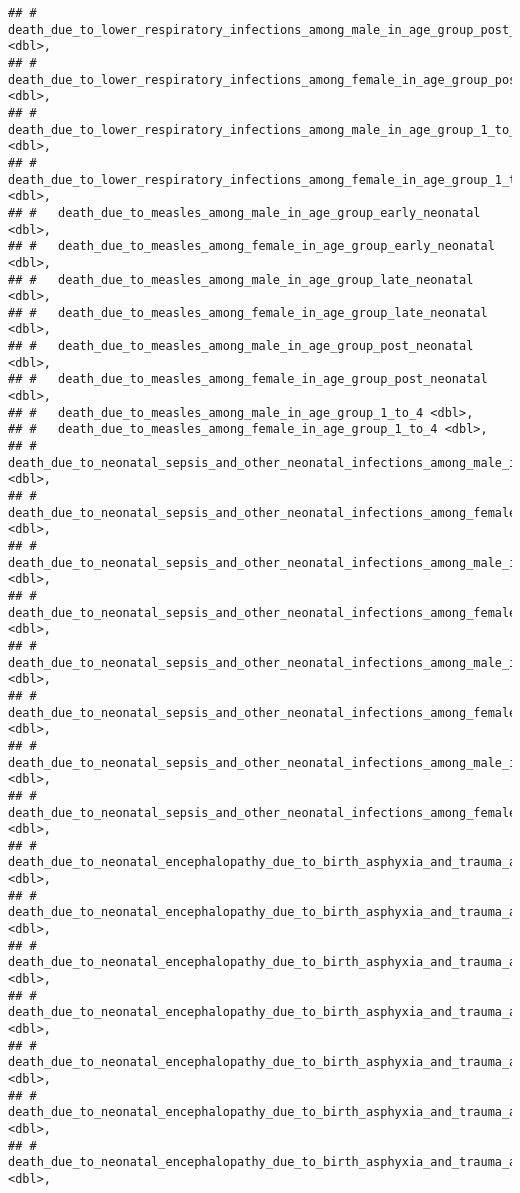 \documentclass[]{article}
\begin{document}
\begin{verbatim}
## #   death_due_to_lower_respiratory_infections_among_male_in_age_group_post_neonatal <dbl>,
## #   death_due_to_lower_respiratory_infections_among_female_in_age_group_post_neonatal <dbl>,
## #   death_due_to_lower_respiratory_infections_among_male_in_age_group_1_to_4 <dbl>,
## #   death_due_to_lower_respiratory_infections_among_female_in_age_group_1_to_4 <dbl>,
## #   death_due_to_measles_among_male_in_age_group_early_neonatal <dbl>,
## #   death_due_to_measles_among_female_in_age_group_early_neonatal <dbl>,
## #   death_due_to_measles_among_male_in_age_group_late_neonatal <dbl>,
## #   death_due_to_measles_among_female_in_age_group_late_neonatal <dbl>,
## #   death_due_to_measles_among_male_in_age_group_post_neonatal <dbl>,
## #   death_due_to_measles_among_female_in_age_group_post_neonatal <dbl>,
## #   death_due_to_measles_among_male_in_age_group_1_to_4 <dbl>,
## #   death_due_to_measles_among_female_in_age_group_1_to_4 <dbl>,
## #   death_due_to_neonatal_sepsis_and_other_neonatal_infections_among_male_in_age_group_early_neonatal <dbl>,
## #   death_due_to_neonatal_sepsis_and_other_neonatal_infections_among_female_in_age_group_early_neonatal <dbl>,
## #   death_due_to_neonatal_sepsis_and_other_neonatal_infections_among_male_in_age_group_late_neonatal <dbl>,
## #   death_due_to_neonatal_sepsis_and_other_neonatal_infections_among_female_in_age_group_late_neonatal <dbl>,
## #   death_due_to_neonatal_sepsis_and_other_neonatal_infections_among_male_in_age_group_post_neonatal <dbl>,
## #   death_due_to_neonatal_sepsis_and_other_neonatal_infections_among_female_in_age_group_post_neonatal <dbl>,
## #   death_due_to_neonatal_sepsis_and_other_neonatal_infections_among_male_in_age_group_1_to_4 <dbl>,
## #   death_due_to_neonatal_sepsis_and_other_neonatal_infections_among_female_in_age_group_1_to_4 <dbl>,
## #   death_due_to_neonatal_encephalopathy_due_to_birth_asphyxia_and_trauma_among_male_in_age_group_early_neonatal <dbl>,
## #   death_due_to_neonatal_encephalopathy_due_to_birth_asphyxia_and_trauma_among_female_in_age_group_early_neonatal <dbl>,
## #   death_due_to_neonatal_encephalopathy_due_to_birth_asphyxia_and_trauma_among_male_in_age_group_late_neonatal <dbl>,
## #   death_due_to_neonatal_encephalopathy_due_to_birth_asphyxia_and_trauma_among_female_in_age_group_late_neonatal <dbl>,
## #   death_due_to_neonatal_encephalopathy_due_to_birth_asphyxia_and_trauma_among_male_in_age_group_post_neonatal <dbl>,
## #   death_due_to_neonatal_encephalopathy_due_to_birth_asphyxia_and_trauma_among_female_in_age_group_post_neonatal <dbl>,
## #   death_due_to_neonatal_encephalopathy_due_to_birth_asphyxia_and_trauma_among_male_in_age_group_1_to_4 <dbl>,

\end{verbatim}
\end{document}
